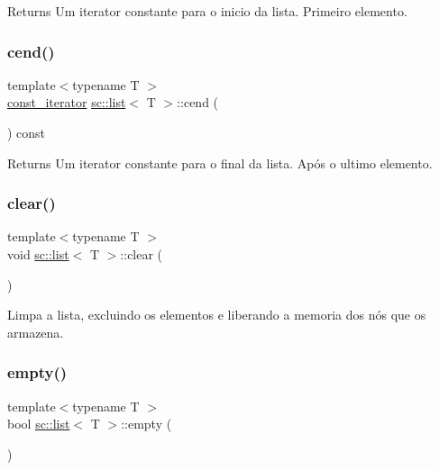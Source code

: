 \begin{DoxyReturn}{Returns}
Um iterator constante para o inicio da lista. Primeiro elemento. 
\end{DoxyReturn}
\mbox{\label{classsc_1_1list_a058f029ebf0d6b5d66c78bb028b45eda}} 
\subsubsection{\texorpdfstring{cend()}{cend()}}
{\footnotesize\ttfamily template$<$typename T $>$ \\
\hyperlink{classsc_1_1list_1_1const__iterator}{const\+\_\+iterator} \hyperlink{classsc_1_1list}{sc\+::list}$<$ T $>$\+::cend (\begin{DoxyParamCaption}{ }\end{DoxyParamCaption}) const\hspace{0.3cm}{\ttfamily [inline]}}

\begin{DoxyReturn}{Returns}
Um iterator constante para o final da lista. Após o ultimo elemento. 
\end{DoxyReturn}
\mbox{\label{classsc_1_1list_aece86319a40d15b88fd1a981ba1a226e}} 
\subsubsection{\texorpdfstring{clear()}{clear()}}
{\footnotesize\ttfamily template$<$typename T $>$ \\
void \hyperlink{classsc_1_1list}{sc\+::list}$<$ T $>$\+::clear (\begin{DoxyParamCaption}{ }\end{DoxyParamCaption})\hspace{0.3cm}{\ttfamily [inline]}}

Limpa a lista, excluindo os elementos e liberando a memoria dos nós que os armazena. \mbox{\label{classsc_1_1list_a8599ccd8f27e0f39a1c3051cd9d05bdb}} 
\subsubsection{\texorpdfstring{empty()}{empty()}}
{\footnotesize\ttfamily template$<$typename T $>$ \\
bool \hyperlink{classsc_1_1list}{sc\+::list}$<$ T $>$\+::empty (\begin{DoxyParamCaption}{ }\end{DoxyParamCaption})\hspace{0.3cm}{\ttfamily [inline]}}

